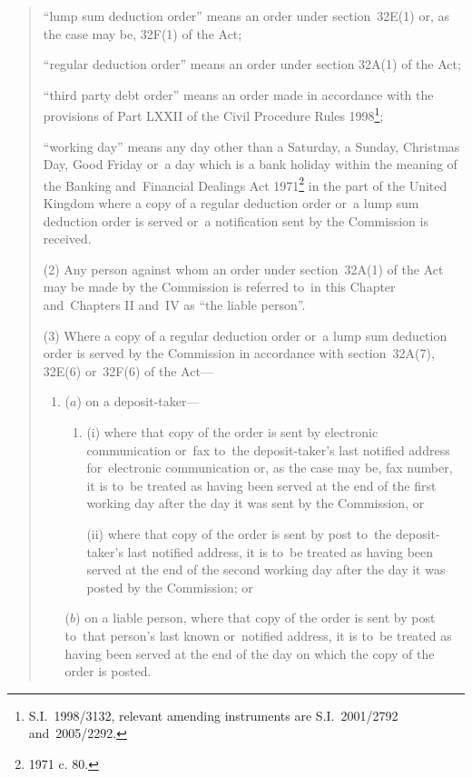 \documentclass[12pt,a4paper]{article}
\begin{document}
\begin{quotation}
\begin{enumerate}
“lump sum deduction order” means an order under section~32E(1) or, as the case may be, 32F(1) of the Act;

“regular deduction order” means an order under section 32A(1) of the Act;

“third party debt order” means an order made in accordance with the provisions of Part LXXII of the Civil Procedure Rules 1998\footnote{S.I.~1998/3132, relevant amending instruments are S.I.~2001/2792 and~2005/2292.};

“working day” means any day other than a Saturday, a Sunday, Christmas Day, Good Friday or~a day which is a bank holiday within the meaning of the Banking and~Financial Dealings Act 1971\footnote{1971 c. 80.} in the part of the United Kingdom where a copy of a regular deduction order or~a lump sum deduction order is served or~a notification sent by the Commission is received.
\end{enumerate}

(2) Any person against whom an order under section~32A(1) of the Act may be made by the Commission is referred to~in this Chapter and~Chapters II and~IV as “the liable person”.

(3) Where a copy of a regular deduction order or~a lump sum deduction order is served by the Commission in accordance with section~32A(7), 32E(6) or~32F(6) of the Act—
\begin{enumerate}\item[]
($a$) on a deposit-taker—
\begin{enumerate}\item[]
(i) where that copy of the order is sent by electronic communication or~fax to~the deposit-taker’s last notified address for~electronic communication or, as the case may be, fax number, it is to~be treated as having been served at the end of the first working day after the day it was sent by the Commission, or

(ii) where that copy of the order is sent by post to~the deposit-taker’s last notified address, it is to~be treated as having been served at the end of the second working day after the day it was posted by the Commission; or
\end{enumerate}

($b$) on a liable person, where that copy of the order is sent by post to~that person’s last known or~notified address, it is to~be treated as having been served at the end of the day on which the copy of the order is posted.
\end{enumerate}


\end{quotation}
\end{document}
